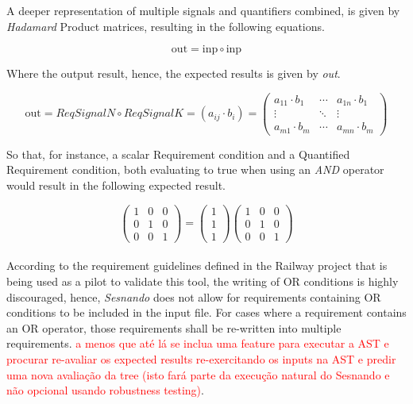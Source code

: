 A deeper representation of multiple signals and quantifiers combined, is given by \textit{Hadamard} Product matrices, resulting in the following equations.


\begin{equation} \label{eq1}
    \text{out} = \text{inp} \circ \text{inp}
\end{equation}

Where the output result, hence, the expected results is given by \textit{out}.

\begin{equation}
\text{out} = ReqSignalN \circ ReqSignalK = (a_{ij}\cdot b_i) = 
\begin{pmatrix} 
a_{11} \cdot b_{1} & \cdots & a_{1n} \cdot b_{1} \\
\vdots & \ddots & \vdots \\ 
a_{m1} \cdot b_{m} & \cdots & a_{mn} \cdot b_{m} 
\end{pmatrix}
\end{equation}

So that, for instance, a scalar Requirement condition and a Quantified Requirement condition, both evaluating to true when using an \textit{AND} operator would result in the following expected result.

\begin{equation}
\begin{pmatrix}
1 & 0 & 0\\
0 & 1 & 0\\
0 & 0 & 1
\end{pmatrix} = 
\begin{pmatrix}
1\\
1\\
1 
\end{pmatrix} 
\begin{pmatrix}
1 & 0 & 0\\
0 & 1 & 0\\
0 & 0 & 1
\end{pmatrix} 
\end{equation}\\

According to the requirement guidelines defined in the Railway project that is being used as a pilot to validate this tool, the writing of OR conditions is highly discouraged, hence, \textit{Sesnando} does not allow for requirements containing OR conditions to be included in the input file. For cases where a requirement contains an OR operator, those requirements shall be re-written into multiple requirements. \textcolor{red}{a menos que até lá se inclua uma feature para executar a AST e procurar re-avaliar os expected results re-exercitando os inputs na AST e predir uma nova avaliação da tree (isto fará parte da execução natural do Sesnando e não opcional usando robustness testing)}.\\



